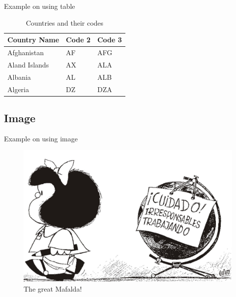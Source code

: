 \documentclass[aspectratio=169,t,xcolor=table]{beamer}
\begin{document}
\begin{frame}{Example on using table}

    \begin{table}[]
        \centering
        \caption{\label{tab:1}Countries and their codes}
        
        \renewcommand{\arraystretch}{1.5}
        \setlength{\tabcolsep}{10pt}
        
        {
            \begin{tabular}{ p{3cm}p{3cm}p{3cm}  }
                \toprule 
                \textbf{Country Name} & \textbf{Code 2} & \textbf{Code 3} \\
                \midrule
                Afghanistan & AF &AFG \\
                Aland Islands & AX   & ALA \\
                Albania &AL & ALB \\
                Algeria    &DZ & DZA \\
                \bottomrule
            \end{tabular}
        }
    \end{table}
    
\end{frame}

\subsection{Image}

\begin{frame}{Example on using image}

    \begin{figure}
        \centering
        \includegraphics[width=.7\textwidth]{figures/mafalda.jpg}
        \caption{The great Mafalda!}
        \label{fig:mafalda}
    \end{figure}
    
\end{frame}
\end{document}
